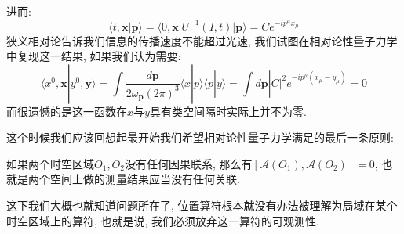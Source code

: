 进而:
\begin{equation}
    \langle t, \mathbf{x}|\mathbf{p}\rangle=\langle 0, \mathbf{x}|U^{-1}(I, t)|\mathbf{p}\rangle=Ce^{-ip^\mu x_\mu}
\end{equation}
狭义相对论告诉我们信息的传播速度不能超过光速, 我们试图在相对论性量子力学中复现这一结果, 如果我们认为需要:
\begin{equation}
    \langle x^0, \mathbf{x}|y^0, \mathbf{y}\rangle=\int \frac{d\mathbf{p}}{2\omega_\mathbf{p}(2\pi)^3}\langle x|p\rangle\langle p|y\rangle=\int d\mathbf{p}|C|^2e^{-ip^\mu (x_\mu-y_\mu)}=0
\end{equation}
而很遗憾的是这一函数在$x$与$y$具有类空间隔时实际上并不为零.\par
这个时候我们应该回想起最开始我们希望相对论性量子力学满足的最后一条原则:\par
如果两个时空区域$O_1, O_2$没有任何因果联系, 那么有$[\mathcal{A}(O_1), \mathcal{A}(O_2)]=0$, 也就是两个空间上做的测量结果应当没有任何关联.\par
这下我们大概也就知道问题所在了, 位置算符根本就没有办法被理解为局域在某个时空区域上的算符, 也就是说, 我们必须放弃这一算符的可观测性.

\ifx\ALL\undefined

\fi